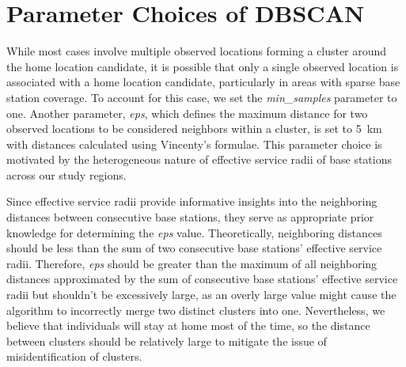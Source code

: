 
\label{sec:appendix_implementation_details}


\section{Parameter Choices of DBSCAN}\label{sec:dbscan}
While most cases involve multiple observed locations forming a cluster around the home location candidate, it is possible that only a single observed location is associated with a home location candidate, particularly in areas with sparse base station coverage.
To account for this case, we set the \textit{min\_samples} parameter to one.
Another parameter, \textit{eps}, which defines the maximum distance for two observed locations to be considered neighbors within a cluster, is set to 5~km with distances calculated using Vincenty's formulae.
This parameter choice is motivated by the heterogeneous nature of effective service radii of base stations across our study regions.

Since effective service radii provide informative insights into the neighboring distances between consecutive base stations, they serve as appropriate prior knowledge for determining the \textit{eps} value.
Theoretically, neighboring distances should be less than the sum of two consecutive base stations' effective service radii.
Therefore, \textit{eps} should be greater than the maximum of all neighboring distances approximated by the sum of consecutive base stations' effective service radii but shouldn't be excessively large, as an overly large value might cause the algorithm to incorrectly merge two distinct clusters into one.
Nevertheless, we believe that individuals will stay at home most of the time, so the distance between clusters should be relatively large to mitigate the issue of misidentification of clusters.

